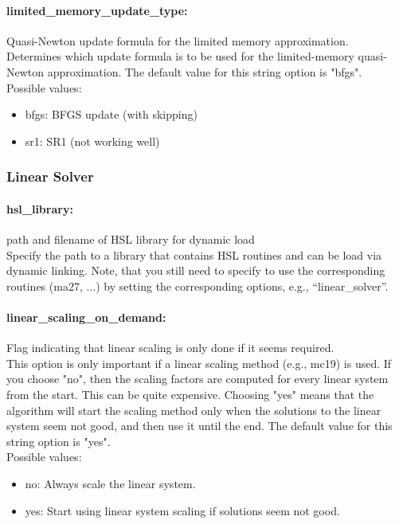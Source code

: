 \paragraph{limited\_memory\_update\_type:}\label{sec:limited_memory_update_type} Quasi-Newton update formula for the limited memory approximation. $\;$ \\
 Determines which update formula is to be used for
the limited-memory quasi-Newton approximation.
The default value for this string option is "bfgs".
\\ 
Possible values:
\begin{itemize}
   \item bfgs: BFGS update (with skipping)
   \item sr1: SR1 (not working well)
\end{itemize}



\subsubsection{Linear Solver}
\label{sec:Linear_Solver}

\paragraph{hsl\_library:}\label{sec:hsl_library} path and filename of HSL library for dynamic load $\;$ \\
 Specify the path to a library that contains HSL
routines and can be load via dynamic
linking. Note, that you still need to specify to
use the corresponding routines (ma27, ...) by
setting the corresponding options, e.g., ``linear\_solver''.


\paragraph{linear\_scaling\_on\_demand:}\label{sec:linear_scaling_on_demand} Flag indicating that linear scaling is only done if it seems required. $\;$ \\
 This option is only important if a linear scaling
method (e.g., mc19) is used.  If you choose "no",
then the scaling factors are computed for every
linear system from the start.  This can be quite
expensive. Choosing "yes" means that the
algorithm will start the scaling method only when
the solutions to the linear system seem not good,
and then use it until the end.
The default value for this string option is "yes".
\\ 
Possible values:
\begin{itemize}
   \item no: Always scale the linear system.
   \item yes: Start using linear system scaling if solutions
seem not good.
\end{itemize}

